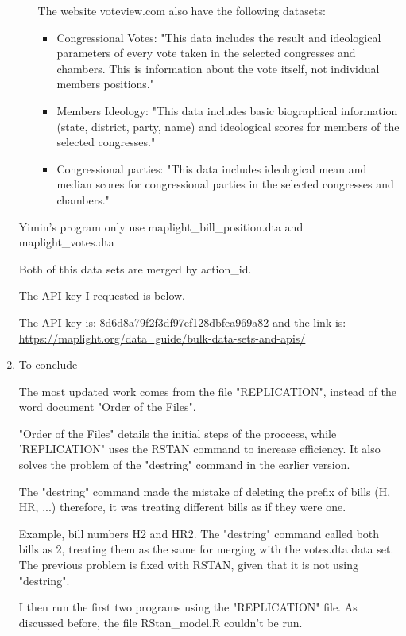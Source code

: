 \documentclass[a4paper,12pt]{article}
\begin{document}
\begin{enumerate}
\begin{itemize}
The website voteview.com also have the following datasets:
\begin{itemize}
\item Congressional Votes: "This data includes the result and ideological parameters of every vote taken in the selected congresses and chambers. 
This is information about the vote itself, not individual members positions." 
\end{itemize}
\begin{itemize}
\item Members Ideology: "This data includes basic biographical information (state, district, party, name) and ideological scores for 
members of the selected congresses."
\end{itemize}
\begin{itemize}
\item Congressional parties: "This data includes ideological mean and median scores for congressional parties in the selected congresses and chambers."
\end{itemize}
\end{itemize}
Yimin’s program only use maplight\_bill\_position.dta and maplight\_votes.dta 

Both of this data sets are merged by action\_id.

The API key I requested is below. 

The API key is: 8d6d8a79f2f3df97ef128dbfea969a82
and the link is:  \url{https://maplight.org/data\_guide/bulk-data-sets-and-apis/}



\item To conclude


The most updated work comes from the file "REPLICATION", instead of the word document "Order of the Files". 

"Order of the Files" details the initial steps of the proccess, while 'REPLICATION" uses the RSTAN command to increase efficiency. It also solves the problem of the "destring" command in the earlier version. 

The "destring" command made the mistake of deleting the prefix of bills (H, HR, ...) therefore, it was treating different bills as if they were one. 

Example, bill numbers H2 and HR2. The "destring" command called both bills as 2, treating them as the same for merging with the votes.dta data set. 
The previous problem is fixed with RSTAN, given that it is not using "destring".

I then run the first two programs using the "REPLICATION" file. As discussed before, the file RStan\_model.R couldn't be run. 


\end{enumerate}
\end{document}
